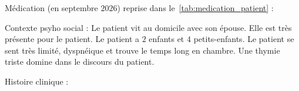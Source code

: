 
Médication (en septembre $2026$) reprise dans le~\cref{tab:medication_patient} :



Contexte psyho social : 
Le patient vit au domicile avec son épouse. Elle est très présente pour le patient. Le patient a $2$ enfants et $4$ petits-enfants. 
Le patient se sent très limité, dyspnéique et trouve le temps long en chambre.  Une thymie triste domine dans le discours du patient. 

Histoire clinique :


